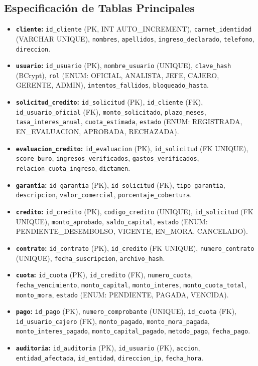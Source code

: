\documentclass[11pt,letterpaper]{report}
\begin{document}
\subsection{Especificación de Tablas Principales}
\begin{itemize}
    \item \textbf{\texttt{cliente}:} \texttt{id\_cliente} (PK, INT AUTO\_INCREMENT), \texttt{carnet\_identidad} (VARCHAR UNIQUE), \texttt{nombres}, \texttt{apellidos}, \texttt{ingreso\_declarado}, \texttt{telefono}, \texttt{direccion}.
    \item \textbf{\texttt{usuario}:} \texttt{id\_usuario} (PK), \texttt{nombre\_usuario} (UNIQUE), \texttt{clave\_hash} (BCrypt), \texttt{rol} (ENUM: OFICIAL, ANALISTA, JEFE, CAJERO, GERENTE, ADMIN), \texttt{intentos\_fallidos}, \texttt{bloqueado\_hasta}.
    \item \textbf{\texttt{solicitud\_credito}:} \texttt{id\_solicitud} (PK), \texttt{id\_cliente} (FK), \texttt{id\_usuario\_oficial} (FK), \texttt{monto\_solicitado}, \texttt{plazo\_meses}, \texttt{tasa\_interes\_anual}, \texttt{cuota\_estimada}, \texttt{estado} (ENUM: REGISTRADA, EN\_EVALUACION, APROBADA, RECHAZADA).
    \item \textbf{\texttt{evaluacion\_credito}:} \texttt{id\_evaluacion} (PK), \texttt{id\_solicitud} (FK UNIQUE), \texttt{score\_buro}, \texttt{ingresos\_verificados}, \texttt{gastos\_verificados}, \texttt{relacion\_cuota\_ingreso}, \texttt{dictamen}.
    \item \textbf{\texttt{garantia}:} \texttt{id\_garantia} (PK), \texttt{id\_solicitud} (FK), \texttt{tipo\_garantia}, \texttt{descripcion}, \texttt{valor\_comercial}, \texttt{porcentaje\_cobertura}.
    \item \textbf{\texttt{credito}:} \texttt{id\_credito} (PK), \texttt{codigo\_credito} (UNIQUE), \texttt{id\_solicitud} (FK UNIQUE), \texttt{monto\_aprobado}, \texttt{saldo\_capital}, \texttt{estado} (ENUM: PENDIENTE\_DESEMBOLSO, VIGENTE, EN\_MORA, CANCELADO).
    \item \textbf{\texttt{contrato}:} \texttt{id\_contrato} (PK), \texttt{id\_credito} (FK UNIQUE), \texttt{numero\_contrato} (UNIQUE), \texttt{fecha\_suscripcion}, \texttt{archivo\_hash}.
    \item \textbf{\texttt{cuota}:} \texttt{id\_cuota} (PK), \texttt{id\_credito} (FK), \texttt{numero\_cuota}, \texttt{fecha\_vencimiento}, \texttt{monto\_capital}, \texttt{monto\_interes}, \texttt{monto\_cuota\_total}, \texttt{monto\_mora}, \texttt{estado} (ENUM: PENDIENTE, PAGADA, VENCIDA).
    \item \textbf{\texttt{pago}:} \texttt{id\_pago} (PK), \texttt{numero\_comprobante} (UNIQUE), \texttt{id\_cuota} (FK), \texttt{id\_usuario\_cajero} (FK), \texttt{monto\_pagado}, \texttt{monto\_mora\_pagada}, \texttt{monto\_interes\_pagado}, \texttt{monto\_capital\_pagado}, \texttt{metodo\_pago}, \texttt{fecha\_pago}.
    \item \textbf{\texttt{auditoria}:} \texttt{id\_auditoria} (PK), \texttt{id\_usuario} (FK), \texttt{accion}, \texttt{entidad\_afectada}, \texttt{id\_entidad}, \texttt{direccion\_ip}, \texttt{fecha\_hora}.
\end{itemize}
\end{document}
